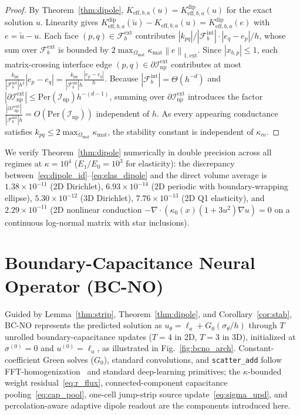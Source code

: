 \documentclass[preprint,11pt]{elsarticle}
\newcommand{\Keffij}[1]{K_{\mathrm{eff},#1}}
\newcommand{\norm}[1]{\left\lVert #1 \right\rVert}
\newcommand{\abs}[1]{\left\lvert #1 \right\rvert}
\begin{document}
\begin{proof}
By Theorem~\ref{thm:dipole}, $\Keffij{b,a}(u) = \Keffij{b,a}^{\mathrm{dip}}(u)$ for the exact solution $u$. Linearity gives $\Keffij{b,a}^{\mathrm{dip}}(\tilde u) - \Keffij{b,a}(u) = \Keffij{b,a}^{\mathrm{dip}}(e)$ with $e = \tilde u - u$. Each face $(p,q) \in \mathcal{F}_b^{\mathrm{ext}}$ contributes $\abs{k_{pq}}/\abs{\mathcal{F}_b^{\mathrm{int}}} \cdot \abs{e_q-e_p}/h$, whose sum over $\mathcal{F}_b^{\mathrm{ext}}$ is bounded by $2\max_{\Omega_{\mathrm{mat}}}\kappa_{\mathrm{mat}}\norm{e}_{1,\mathrm{ext}}$. Since $\abs{x_{b,p}} \le 1$, each matrix-crossing interface edge $(p,q) \in \partial\mathcal{I}_{\mathrm{np}}^{\mathrm{ext}}$ contributes at most $\frac{k_{pq}}{\abs{\mathcal{F}_b^{\mathrm{int}}} h^2}\abs{e_p - e_q} = \frac{k_{pq}}{\abs{\mathcal{F}_b^{\mathrm{int}}} h}\frac{\abs{e_p - e_q}}{h}$. Because $\abs{\mathcal{F}_b^{\mathrm{int}}} = \Theta(h^{-d})$ and $\abs{\partial\mathcal{I}_{\mathrm{np}}^{\mathrm{ext}}} \le \mathrm{Per}(\mathcal{I}_{\mathrm{np}}) h^{-(d-1)}$, summing over $\partial\mathcal{I}_{\mathrm{np}}^{\mathrm{ext}}$ introduces the factor $\frac{\abs{\partial\mathcal{I}_{\mathrm{np}}^{\mathrm{ext}}}}{\abs{\mathcal{F}_b^{\mathrm{int}}} h} = O(\mathrm{Per}(\mathcal{I}_{\mathrm{np}}))$ independent of $h$. As every appearing conductance satisfies $k_{pq} \le 2\max_{\Omega_{\mathrm{mat}}} \kappa_{\mathrm{mat}}$, the stability constant is independent of $\kappa_m$.
\end{proof}

We verify Theorem~\ref{thm:dipole} numerically in double precision across all regimes at $\kappa = 10^4$ ($E_1/E_0 = 10^3$ for elasticity): the discrepancy between~\eqref{eq:dipole_id}--\eqref{eq:elas_dipole} and the direct volume average is $1.38\times 10^{-11}$ (2D Dirichlet), $6.93\times 10^{-14}$ (2D periodic with boundary-wrapping ellipse), $5.30\times 10^{-12}$ (3D Dirichlet), $7.76\times 10^{-13}$ (2D Q1 elasticity), and $2.29\times 10^{-11}$ (2D nonlinear conduction $-\nabla\cdot(\kappa_0(x)(1+3u^2)\nabla u)=0$ on a continuous log-normal matrix with star inclusions).

\section{Boundary-Capacitance Neural Operator (BC-NO)}\label{sec:method}

Guided by Lemma~\ref{thm:strip}, Theorem~\ref{thm:dipole}, and Corollary~\ref{cor:stab}, BC-NO represents the predicted solution as $u_\theta = \ell_a + G_0(\sigma_\theta / h)$ through $T$ unrolled boundary-capacitance updates ($T=4$ in 2D, $T=3$ in 3D), initialized at $\sigma^{(0)} = 0$ and $u^{(0)} = \ell_a$, as illustrated in Fig.~\ref{fig:bcno_arch}. Constant-coefficient Green solves ($G_0$), standard convolutions, and \texttt{scatter\_add} follow FFT-homogenization~\cite{moulinec1998numerical} and standard deep-learning primitives; the $\kappa$-bounded weight residual~\eqref{eq:r_flux}, connected-component capacitance pooling~\eqref{eq:cap_pool}, one-cell jump-strip source update~\eqref{eq:sigma_upd}, and percolation-aware adaptive dipole readout are the components introduced here.
\end{document}
